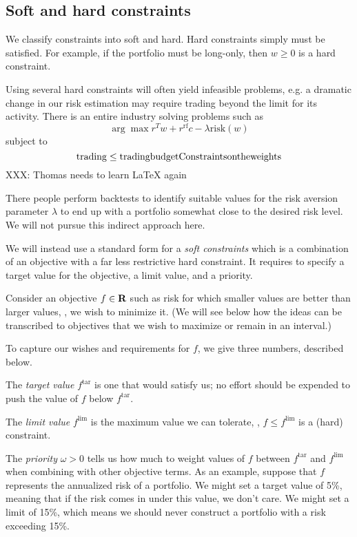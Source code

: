 \documentclass[12pt]{article}
\begin{document}



\subsection{Soft and hard constraints}
We classify constraints into soft and hard.
Hard constraints simply must be satisfied.
For example, if the portfolio must be long-only, then $w\geq 0$
is a hard constraint.

Using several hard constraints will often yield infeasible problems, e.g. a dramatic
change in our risk estimation may require trading beyond the limit for its activity.
There is an entire industry solving problems such as
\[
   \arg \max r^T w + r^\mathrm{rf} c - \lambda \mathrm{risk}(w)
\]
subject to
\[
    \mathrm{trading} \leq \mathrm{trading budget} \\
    \mathrm{Constraints on the weights}
\]
XXX: Thomas needs to learn LaTeX again

There people perform backtests to identify suitable values for the risk aversion
parameter $\lambda$ to end up with a portfolio somewhat close to the desired risk
level. We will not pursue this indirect approach here.

We will instead use a standard form for a \emph{soft constraints} which is a combination
of an objective with a far less restrictive hard constraint. It requires
to specify a target value for the objective, a limit value, and a priority.

Consider an objective $f\in {\mbox{\bf R}}$ such as risk for which
smaller values are better than larger values, \ie, we wish to minimize it.
(We will see below how the ideas can be transcribed to
objectives that we wish to maximize or remain in an interval.)

To capture our wishes and requirements for $f$, we give three
numbers, described below.
\BIT
\item The \emph{target value} $f^\mathrm{tar}$ is one that would satisfy us;
no effort should be expended
to push the value of $f$ below $f^\mathrm{tar}$.
\item The \emph{limit value} $f^\mathrm{lim}$ is the maximum value we can tolerate, \ie,
$f \leq f^\mathrm{lim}$ is a (hard) constraint.
\item The \emph{priority} $\omega>0$ tells us how much to weight values of $f$
between $f^\mathrm{tar}$ and $f^\mathrm{lim}$ when combining with other
objective terms.
\EIT
As an example, suppose that $f$ represents the annualized risk of a portfolio.
We might set a target value of 5\%, meaning that if the risk comes in under
this value, we don't care. We might set a limit of 15\%, which means we should
never construct a portfolio with a risk exceeding 15\%.
\end{document}
